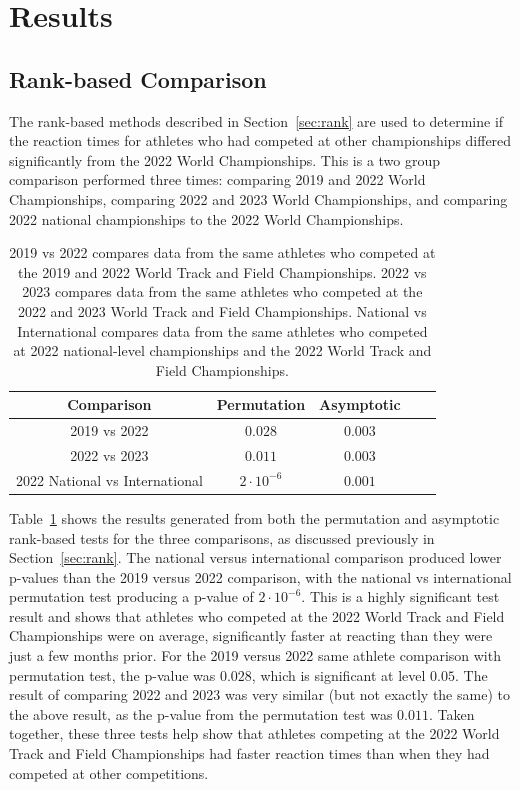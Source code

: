 \documentclass[12pt, letterpaper, titlepage]{article}
\begin{document}
\section{Results} \label{sec:Results}

\subsection{Rank-based Comparison} \label{subsec:Results_Rank}

The rank-based methods described in Section~\ref{sec:rank} are used
to determine if the reaction times for athletes who had competed at other 
championships differed significantly from the 2022 World Championships. This is
a two group comparison performed three times: comparing 2019 and 2022 World
Championships, comparing 2022 and 2023 World Championships, and comparing 2022 
national championships to the 2022 World Championships.


\begin{table}
  \centering
  \caption{2019 vs 2022 compares data from the same athletes who competed at the
  2019 and 2022 World Track and Field Championships. 2022 vs 2023 compares data
  from the same athletes who competed at the 2022 and 2023 World Track and Field
  Championships. National vs International compares data from the same athletes
  who competed at 2022 national-level championships and the 2022 World Track and
  Field Championships.}
  \begin{tabular}{c c c c c} 
   \toprule
   Comparison & Permutation & Asymptotic \\ 
   \midrule
   2019 vs 2022 & $0.028$ & $0.003$ \\
   2022 vs 2023 & $0.011$ & $0.003$ \\
   2022 National vs International & $2\cdot10^{-6}$ & $0.001$ \\
   \bottomrule
  \end{tabular}
  \label{tab:Clusrankresults}
\end{table}


Table~\ref{tab:Clusrankresults} shows the results generated from both the 
permutation and asymptotic rank-based tests for the three comparisons, 
as discussed previously in Section~\ref{sec:rank}. The national versus international
comparison produced lower p-values than the 2019 versus 2022 comparison, with the
national vs international permutation test producing a p-value of $2\cdot10^{-6}$.
This is a highly significant test result and shows that athletes who competed at the
2022 World Track and Field Championships were on average, significantly faster
at reacting than they were just a few months prior. For the 2019 versus 2022
same athlete comparison with permutation test, the p-value was 
$0.028$, which is significant at level $0.05$.  The result of
comparing 2022 and 2023 was very similar (but not exactly the same) to the above
result, as the p-value from the permutation test was $0.011$.
Taken together, these three
tests help show that athletes competing at the 2022 World Track and Field
Championships had faster reaction times than when they had competed at other
competitions.
\end{document}
